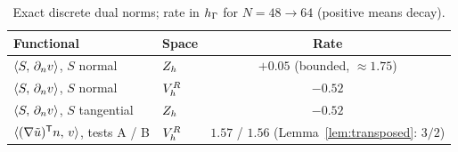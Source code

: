 \begin{table}[t]
\centering
\caption{Exact discrete dual norms; rate in $h_\Gamma$ for $N=48\to64$ (positive means decay).}\label{tab:lemma}
\begin{tabular}{llc}
\toprule
Functional & Space & Rate\\
\midrule
$\langle S,\, \partial_n v\rangle$, $S$ normal & $Z_h$ & $+0.05$ (bounded, $\approx1.75$)\\
$\langle S,\, \partial_n v\rangle$, $S$ normal & $V_h^R$ & $-0.52$\\
$\langle S,\, \partial_n v\rangle$, $S$ tangential & $Z_h$ & $-0.52$\\
$\langle (\nabla\tilde u)^{\mathsf T}n,\, v\rangle$, tests A / B & $V_h^R$ & $1.57$ / $1.56$ (Lemma~\ref{lem:transposed}: $3/2$)\\
\bottomrule
\end{tabular}
\end{table}


